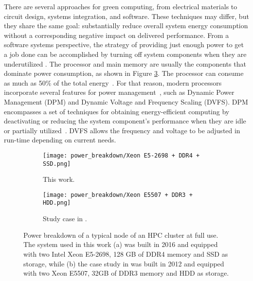 \documentclass{ieeeaccess}
\begin{document}
There are several approaches for green computing, from electrical materials to circuit design, systems integration, and software. These techniques may differ, but they share the same goal: substantially reduce overall system energy consumption without a corresponding negative impact on delivered performance. 
From a software systems perspective, the strategy of providing just enough power to get a job done can be accomplished by turning off system components when they are underutilized \cite{Mathew2012Energy-awareNetworks}.
The processor and main memory are usually the components that dominate power consumption, as shown in Figure  \ref{fig:powerbreakdown}.
The processor can consume as much as 50\% of the total energy~\cite{Fan2007, Barroso2007TheComputing, Malladi2012TowardsDRAM}. For that reason, modern processors incorporate several features for power management~\cite{Rotem2012Power-managementBridge, Brown2005, Hackenberg2015}, such as Dynamic Power Management (DPM) and Dynamic Voltage and Frequency Scaling (DVFS). 
DPM encompasses a set of techniques for obtaining energy-efficient computing by deactivating or reducing the system component's performance when they are idle or partially utilized~\cite{Shuja2012Energy-efficientCenters, Benini2000AManagement}.
DVFS allows the frequency and voltage to be adjusted in run-time depending on current needs.

\begin{figure}[htb!]
    \centering
     
    \begin{subfigure}[b]{0.45\textwidth}
    \texttt{[image: power\_breakdown/Xeon E5-2698 + DDR4 + SSD.png]}
    \caption{This work.}
    \label{fig:1}
    \end{subfigure}
    \begin{subfigure}[b]{0.45\textwidth}
    \texttt{[image: power\_breakdown/Xeon E5507 + DDR3 + HDD.png]}
    \caption{Study case in \cite{Malladi2012TowardsDRAM}.}
    \label{fig:2}
    \end{subfigure}
    
    \hfill
    \caption{Power breakdown of a typical node of an HPC cluster at full use. The system used in this work (a) was built in 2016 and equipped with two Intel Xeon E5-2698, 128 GB of DDR4 memory and SSD as storage, while (b) the case study in \cite{Malladi2012TowardsDRAM} was built in 2012 and equipped with two Xeon E5507, 32GB of DDR3 memory and HDD as storage.}
    \label{fig:powerbreakdown}
\end{figure}
\end{document}
